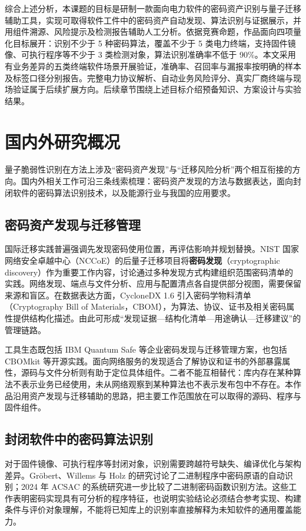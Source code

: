 综合上述分析，本课题的目标是研制一款面向电力软件的密码资产识别与量子迁移辅助工具，实现可取得软件工件中的密码资产自动发现、算法识别与证据展示，并用组件溯源、风险提示及检测报告辅助人工分析。依据竞赛命题，作品面向四项量化目标展开：识别不少于 5 种密码算法，覆盖不少于 5 类电力终端，支持固件镜像、可执行程序等不少于 3 类检测对象，算法识别准确率不低于 90\%。本文采用有业务差异的五类终端软件场景开展验证，准确率、召回率与漏报率按明确的样本及标签口径分别报告。完整电力协议解析、自动业务风险评分、真实厂商终端与现场验证属于后续扩展方向。后续章节围绕上述目标介绍预备知识、方案设计与实验结果。

\section{国内外研究概况}

量子脆弱性识别在方法上涉及“密码资产发现”与“迁移风险分析”两个相互衔接的方向。国内外相关工作可沿三条线索梳理：密码资产发现的方法与数据表达，面向封闭软件的密码算法识别技术，以及能源行业与我国的应用要求。

\subsection{密码资产发现与迁移管理}

国际迁移实践普遍强调先发现密码使用位置，再评估影响并规划替换。NIST 国家网络安全卓越中心（NCCoE）的后量子迁移项目将\textbf{密码发现}（cryptographic discovery）作为重要工作内容，讨论通过多种发现方式构建组织范围密码清单的实践\cite{nccoe180038}。网络发现、端点与文件分析、应用与配置清点各自提供部分视图，需要保留来源和盲区。在数据表达方面，CycloneDX 1.6 引入密码学物料清单（Cryptography Bill of Materials，CBOM），为算法、协议、证书及相关密码属性提供结构化描述\cite{cbom16}。由此可形成“发现证据—结构化清单—用途确认—迁移建议”的管理链路。

工具生态既包括 IBM Quantum Safe 等企业密码发现与迁移管理方案，也包括 CBOMkit 等开源实践\cite{ibm-quantum-safe,cbomkit}。面向网络服务的发现适合了解协议和证书的外部暴露属性，源码与文件分析则有助于定位具体组件。二者不能互相替代：库内存在某种算法不表示业务已经使用，未从网络观察到某种算法也不表示发布包中不存在。本作品沿用资产发现与迁移辅助的思路，把主要工作范围放在可以取得的源码、程序与固件组件。

\subsection{封闭软件中的密码算法识别}

对于固件镜像、可执行程序等封闭对象，识别需要跨越符号缺失、编译优化与架构差异。Gr{\"o}bert、Willems 与 Holz 的研究讨论了二进制程序中密码原语的自动识别\cite{groebert2011}；2024 年 ACSAC 的系统研究进一步比较了二进制密码函数识别方法\cite{acsac24}。这些工作表明密码实现具有可分析的程序特征，也说明实验结论必须结合参考实现、构建条件与评价对象理解，不能将已知库上的识别率直接解释为未知软件的通用覆盖能力。


